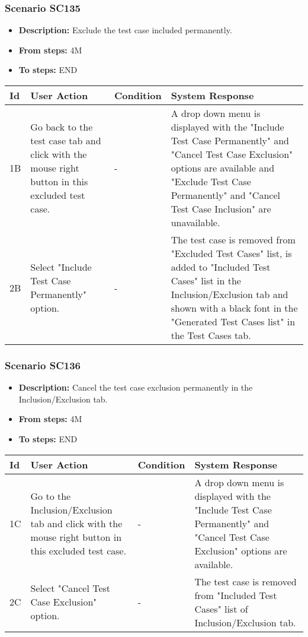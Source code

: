 \documentclass[a4paper,11pt]{article}
\newcommand{\bl}{\\ \hline}
\begin{document}
\subsubsection*{Scenario SC135}
\begin{itemize}
\item {\bf Description:} Exclude the test case included permanently.
				
\item {\bf From steps:} 4M
\item {\bf To steps:} END
\end{itemize}
\begin{tabular}{|p{0.4in}|p{1.5in}|p{1.5in}|p{1.5in}|}
\hline
Id & User Action & Condition & System Response \bl 
1B & Go back to the test case tab and click with the mouse right
						button in this excluded test case. & - & A drop down menu is displayed with the "Include Test Case
						Permanently" and "Cancel Test Case Exclusion" options are
						available and "Exclude Test Case Permanently" and "Cancel Test
						Case Inclusion" are unavailable.\bl
2B & Select "Include Test Case Permanently" option. & - & The test case is removed from "Excluded Test Cases" list,
						is added to "Included Test Cases" list in the Inclusion/Exclusion
						tab and shown with a black font in the "Generated Test Cases list"
						in the Test Cases tab.\bl
\end{tabular}
\subsubsection*{Scenario SC136}
\begin{itemize}
\item {\bf Description:} Cancel the test case exclusion permanently in the
					Inclusion/Exclusion tab.
\item {\bf From steps:} 4M
\item {\bf To steps:} END
\end{itemize}
\begin{tabular}{|p{0.4in}|p{1.5in}|p{1.5in}|p{1.5in}|}
\hline
Id & User Action & Condition & System Response \bl 
1C & Go to the Inclusion/Exclusion tab and click with the mouse
						right button in this excluded test case. & - & A drop down menu is displayed with the "Include Test Case
						Permanently" and "Cancel Test Case Exclusion" options are
						available.\bl
2C & Select "Cancel Test Case Exclusion" option. & - & The test case is removed from "Included Test Cases" list
						of Inclusion/Exclusion tab.\bl
\end{tabular}
\end{document}
